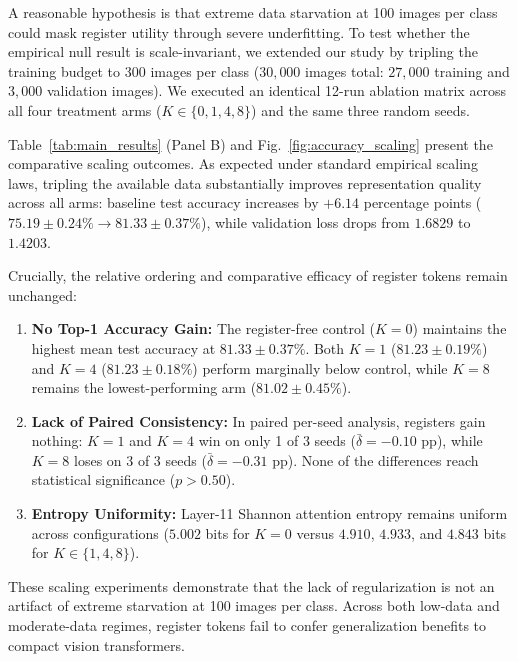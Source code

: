 A reasonable hypothesis is that extreme data starvation at 100 images per class could mask register utility through severe underfitting. To test whether the empirical null result is scale-invariant, we extended our study by tripling the training budget to 300 images per class ($30{,}000$ images total: $27{,}000$ training and $3{,}000$ validation images). We executed an identical 12-run ablation matrix across all four treatment arms ($K \in \{0, 1, 4, 8\}$) and the same three random seeds.

Table~\ref{tab:main_results} (Panel B) and Fig.~\ref{fig:accuracy_scaling} present the comparative scaling outcomes. As expected under standard empirical scaling laws, tripling the available data substantially improves representation quality across all arms: baseline test accuracy increases by $+6.14$ percentage points ($75.19 \pm 0.24\% \to 81.33 \pm 0.37\%$), while validation loss drops from $1.6829$ to $1.4203$.

Crucially, the relative ordering and comparative efficacy of register tokens remain unchanged:
\begin{enumerate}
\item \textbf{No Top-1 Accuracy Gain:} The register-free control ($K=0$) maintains the highest mean test accuracy at $81.33 \pm 0.37\%$. Both $K=1$ ($81.23 \pm 0.19\%$) and $K=4$ ($81.23 \pm 0.18\%$) perform marginally below control, while $K=8$ remains the lowest-performing arm ($81.02 \pm 0.45\%$).
\item \textbf{Lack of Paired Consistency:} In paired per-seed analysis, registers gain nothing: $K=1$ and $K=4$ win on only 1 of 3 seeds ($\bar{\delta} = -0.10$ pp), while $K=8$ loses on 3 of 3 seeds ($\bar{\delta} = -0.31$ pp). None of the differences reach statistical significance ($p > 0.50$).
\item \textbf{Entropy Uniformity:} Layer-11 Shannon attention entropy remains uniform across configurations ($5.002$ bits for $K=0$ versus $4.910$, $4.933$, and $4.843$ bits for $K \in \{1, 4, 8\}$).
\end{enumerate}

These scaling experiments demonstrate that the lack of regularization is not an artifact of extreme starvation at 100 images per class. Across both low-data and moderate-data regimes, register tokens fail to confer generalization benefits to compact vision transformers.
